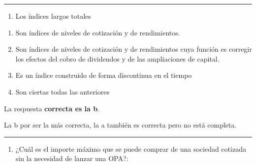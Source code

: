 \documentclass[
  letterpaper,
  DIV=11,
  numbers=noendperiod]{scrreprt}
\providecommand{\tightlist}{%
  \setlength{\itemsep}{0pt}\setlength{\parskip}{0pt}}\usepackage{longtable,booktabs,array}
\begin{document}
\begin{center}\rule{0.5\linewidth}{0.5pt}\end{center}

\begin{enumerate}
\def\labelenumi{\arabic{enumi}.}
\setcounter{enumi}{42}
\tightlist
\item
  Los índices largos totales
\end{enumerate}

\begin{enumerate}
\def\labelenumi{\alph{enumi})}
\item
  Son índices de niveles de cotización y de rendimientos.
\item
  Son índices de niveles de cotización y de rendimientos cuya función es
  corregir los efectos del cobro de dividendos y de las ampliaciones de
  capital.
\item
  Es un índice construido de forma discontinua en el tiempo
\item
  Son ciertas todas las anteriores
\end{enumerate}

\begin{tcolorbox}[enhanced jigsaw, left=2mm, opacityback=0, colback=white, breakable, arc=.35mm, bottomrule=.15mm, rightrule=.15mm, toprule=.15mm, leftrule=.75mm, colframe=quarto-callout-tip-color-frame]
\begin{minipage}[t]{5.5mm}
\textcolor{quarto-callout-tip-color}{\faLightbulb}
\end{minipage}%
\begin{minipage}[t]{\textwidth - 5.5mm}

La respuesta \textbf{correcta es la b}.

La b por ser la más correcta, la a también es correcta pero no está
completa.

\end{minipage}%
\end{tcolorbox}

\begin{center}\rule{0.5\linewidth}{0.5pt}\end{center}

\begin{enumerate}
\def\labelenumi{\arabic{enumi}.}
\setcounter{enumi}{43}
\tightlist
\item
  ¿Cuál es el importe máximo que se puede comprar de una sociedad
  cotizada sin la necesidad de lanzar una OPA?:
\end{enumerate}
\end{document}
